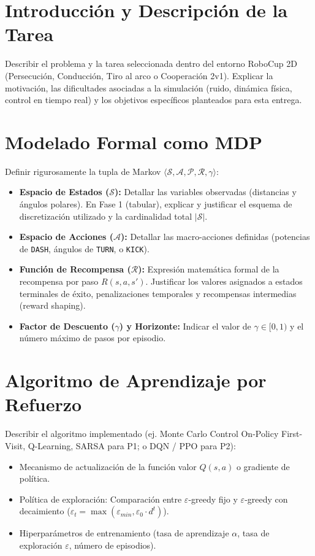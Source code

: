 \documentclass[11pt,a4paper]{article}
\begin{document}
\section{Introducción y Descripción de la Tarea}
Describir el problema y la tarea seleccionada dentro del entorno RoboCup 2D (Persecución, Conducción, Tiro al arco o Cooperación 2v1). Explicar la motivación, las dificultades asociadas a la simulación (ruido, dinámica física, control en tiempo real) y los objetivos específicos planteados para esta entrega.

\section{Modelado Formal como MDP}
Definir rigurosamente la tupla de Markov $\langle \mathcal{S}, \mathcal{A}, \mathcal{P}, \mathcal{R}, \gamma \rangle$:

\begin{itemize}
    \item \textbf{Espacio de Estados ($\mathcal{S}$):} Detallar las variables observadas (distancias y ángulos polares). En Fase 1 (tabular), explicar y justificar el esquema de discretización utilizado y la cardinalidad total $|\mathcal{S}|$.
    \item \textbf{Espacio de Acciones ($\mathcal{A}$):} Detallar las macro-acciones definidas (potencias de \texttt{DASH}, ángulos de \texttt{TURN}, o \texttt{KICK}).
    \item \textbf{Función de Recompensa ($\mathcal{R}$):} Expresión matemática formal de la recompensa por paso $R(s, a, s')$. Justificar los valores asignados a estados terminales de éxito, penalizaciones temporales y recompensas intermedias (reward shaping).
    \item \textbf{Factor de Descuento ($\gamma$) y Horizonte:} Indicar el valor de $\gamma \in [0, 1)$ y el número máximo de pasos por episodio.
\end{itemize}

\section{Algoritmo de Aprendizaje por Refuerzo}
Describir el algoritmo implementado (ej. Monte Carlo Control On-Policy First-Visit, Q-Learning, SARSA para P1; o DQN / PPO para P2):
\begin{itemize}
    \item Mecanismo de actualización de la función valor $Q(s, a)$ o gradiente de política.
    \item Política de exploración: Comparación entre $\varepsilon$-greedy fijo y $\varepsilon$-greedy con decaimiento ($\varepsilon_t = \max(\varepsilon_{min}, \varepsilon_0 \cdot d^t)$).
    \item Hiperparámetros de entrenamiento (tasa de aprendizaje $\alpha$, tasa de exploración $\varepsilon$, número de episodios).
\end{itemize}
\end{document}
